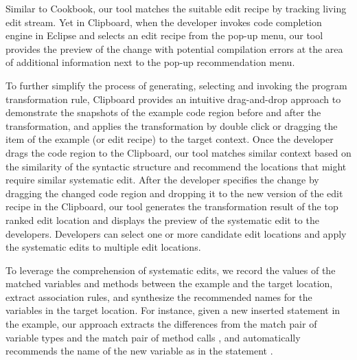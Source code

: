 Similar to Cookbook, our tool matches the suitable edit recipe by tracking living edit stream. Yet in Clipboard, when the developer invokes code completion engine in Eclipse and selects an edit recipe from the pop-up menu, our tool provides the  preview of the change with potential compilation errors at the area of additional information next to the pop-up recommendation menu.


To further simplify  the process of generating, selecting and invoking the program transformation rule,   Clipboard provides an intuitive drag-and-drop approach to demonstrate the snapshots of the example code region before and after the transformation, and applies the transformation by double click or dragging the item of the example (or edit recipe) to the target context. Once the developer drags the code region to the Clipboard, our tool matches similar context based on the similarity of the syntactic structure and recommend the locations that might require similar systematic edit. After the developer specifies the change by dragging the  changed code region and dropping it to the new version of the edit recipe in the Clipboard, our tool generates the transformation result of the top ranked edit location and displays the preview of the systematic edit to the developers. Developers can select one or more candidate edit locations and apply the systematic edits to multiple edit locations.   


To leverage the comprehension of systematic edits, we record the values of the matched variables and methods between the example and the target location, extract association rules, and synthesize the recommended names for the variables in the target location. For instance, given a new inserted statement 
in the example, our approach extracts the differences from the match pair of variable types  and the match pair of method calls , and automatically recommends the  name of the new variable  as  in the statement .   

